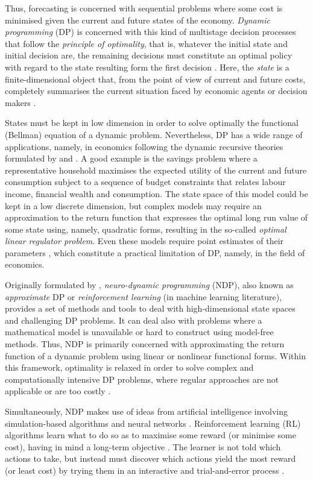 Thus, forecasting is concerned with sequential problems where some cost is minimised given the current and future states of the economy. \emph{Dynamic programming} (DP) is concerned with this kind of multistage decision processes that follow the \emph{principle of optimality}, that is, whatever the initial state and initial decision are, the remaining decisions must constitute an optimal policy with regard to the state resulting form the first decision \citep{Bellman1962}. Here, the \emph{state} is a finite-dimensional object that, from the point of view of current and future costs, completely summarises the current situation faced by economic agents or decision makers \cite[section 1.4]{Ljungqvist2018}. 

States must be kept in low dimension in order to solve optimally the functional (Bellman) equation of a dynamic problem. Nevertheless, DP has a wide range of applications, namely, in economics following the dynamic recursive theories formulated by \citet{Stockey1989} and \citet{Ljungqvist2018}. A good example is the savings problem where a representative household maximises the expected utility of the current and future consumption subject to a sequence of budget constraints that relates labour income, financial wealth and consumption. The state space of this model could be kept in a low discrete dimension, but complex models may require an approximation to the return function that expresses the optimal long run value of some state using, namely, quadratic forms, resulting in the so-called \emph{optimal linear regulator problem}. Even these models require point estimates of their parameters \citep{Mannor2007}, which constitute a practical limitation of DP, namely, in the field of economics.

Originally formulated by \citet{Bertsekas1996}, \emph{neuro-dynamic programming} (NDP), also known as \emph{approximate} DP or \emph{reinforcement learning} (in machine learning literature), provides a set of methods and tools to deal with high-dimensional state spaces and challenging DP problems. It can deal also with problems where a mathematical model is unavailable or hard to construct using model-free methods. Thus, NDP is primarily concerned with approximating the return function of a dynamic problem using linear or nonlinear functional forms. Within this framework, optimality is relaxed in order to solve complex and computationally intensive DP problems, where regular approaches are not applicable or are too costly \citep{Bertsekas2011}.

Simultaneously, NDP makes use of ideas from artificial intelligence involving simulation-based algorithms and neural networks \citep{vanRoy1997}. Reinforcement learning (RL) algorithms learn what to do so as to maximise some reward (or minimise some cost), having in mind a long-term objective \citep{Szepesvari2010}. The learner is not told which actions to take, but instead must discover which actions yield the most reward (or least cost) by trying them in an interactive and trial-and-error process \citep{Sutton2018}.


